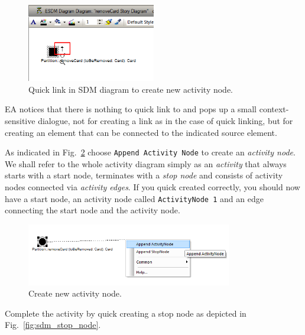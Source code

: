 \begin{figure}[htp]
\begin{center}
  \includegraphics[width=0.5\textwidth]{pics/sdmBilder/removeCard/sdm03RAW}
  \caption{Quick link in SDM diagram to create new activity node.}  
  \label{fig:sdm_quicklink}
\end{center}
\end{figure}

EA notices that there is nothing to quick link to and pops up a small
context-sensitive dialogue, not for creating a link as in the case of quick
linking, but for creating an element that can be connected to the
indicated source element. 

As indicated in Fig.~\ref{fig:sdm_new_activity_node}
choose \texttt{Append Activity Node} to create an \emph{activity node}.  We
shall refer to the whole activity diagram simply as an \emph{activity} that
always starts with a start node, terminates with a \emph{stop node} and consists
of activity nodes connected via \emph{activity edges}.  If you quick created
correctly, you should now have a start node, an activity node called
\texttt{ActivityNode 1} and an edge connecting the start node and the activity
node.

\begin{figure}[htp]
\begin{center}
  \includegraphics[width=0.8\textwidth]{pics/sdmBilder/removeCard/sdm04RAW}
  \caption{Create new activity node.}  
  \label{fig:sdm_new_activity_node}
\end{center}
\end{figure}

Complete the activity by quick creating a stop node as depicted in
Fig.~\ref{fig:sdm_stop_node}.

